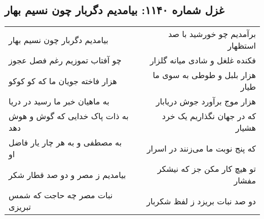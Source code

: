 \begin{center}
\section*{غزل شماره ۱۱۴۰: بیامدیم دگربار چون نسیم بهار}
\label{sec:1140}
\begin{longtable}{l p{0.5cm} r}
بیامدیم دگربار چون نسیم بهار
&&
برآمدیم چو خورشید با صد استظهار
\\
چو آفتاب تموزیم رغم فصل عجوز
&&
فکنده غلغل و شادی میانه گلزار
\\
هزار فاخته جویان ما که کو کوکو
&&
هزار بلبل و طوطی به سوی ما طیار
\\
به ماهیان خبر ما رسید در دریا
&&
هزار موج برآورد جوش دریابار
\\
به ذات پاک خدایی که گوش و هوش دهد
&&
که در جهان نگذاریم یک خرد هشیار
\\
به مصطفی و به هر چار یار فاضل او
&&
که پنج نوبت ما می‌زنند در اسرار
\\
بیامدیم ز مصر و دو صد قطار شکر
&&
تو هیچ کار مکن جز که نیشکر مفشار
\\
نبات مصر چه حاجت که شمس تبریزی
&&
دو صد نبات بریزد ز لفظ شکربار
\\
\end{longtable}
\end{center}
